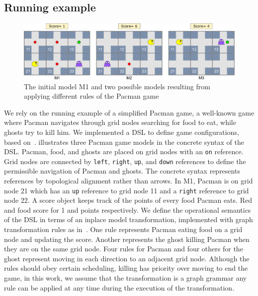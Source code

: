 \subsection{Running example}\label{sec:example}

\begin{figure}
    \centering
    \includegraphics[width=\linewidth]{images/pacman_example}
    \caption{The initial model M1 and two possible models resulting from applying different rules of the Pacman game}
    \label{fig:example}
\end{figure}
%
We rely on the running example of a simplified Pacman game, a well-known game where Pacman navigates through grid nodes searching for food to eat, while ghosts try to kill him.
We implemented a DSL to define game configurations, based on~\cite{Syriani2013a}.
 illustrates three Pacman game models in the concrete syntax of the DSL.
Pacman, food, and ghosts are placed on grid nodes with an \texttt{on} reference.
Grid nodes are connected by \texttt{left}, \texttt{right}, \texttt{up}, and \texttt{down} references to define the permissible navigation of Pacman and ghosts.
The concrete syntax represents references by topological alignment rather than arrows.
In M1, Pacman is on grid node 21 which has an \texttt{up} reference to grid node 11 and a \texttt{right} reference to grid node 22.
A score object keeps track of the points of every food Pacman eats.
Red and food score for 1 and points respectively.
We define the operational semantics of the DSL in terms of an inplace model transformation, implemented with graph transformation rules as in~\cite{Syriani2013a}.
One rule represents Pacman eating food on a grid node and updating the score.
Another represents the ghost killing Pacman when they are on the same grid node.
Four rules for Pacman and four others for the ghost represent moving in each direction to an adjacent grid node.
Although the rules should obey certain scheduling, \eg killing has priority over moving to end the game, in this work, we assume that the transformation is a graph grammar \ie any rule can be applied at any time during the execution of the transformation.

